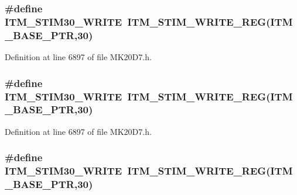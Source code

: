 \subsubsection[{\texorpdfstring{I\+T\+M\+\_\+\+S\+T\+I\+M30\+\_\+\+W\+R\+I\+TE}{ITM_STIM30_WRITE}}]{\setlength{\rightskip}{0pt plus 5cm}\#define I\+T\+M\+\_\+\+S\+T\+I\+M30\+\_\+\+W\+R\+I\+TE~{\bf I\+T\+M\+\_\+\+S\+T\+I\+M\+\_\+\+W\+R\+I\+T\+E\+\_\+\+R\+EG}({\bf I\+T\+M\+\_\+\+B\+A\+S\+E\+\_\+\+P\+TR},30)}\hypertarget{group___i_t_m___register___accessor___macros_ga04082ae600d9a3012f4c9861fe7d0ea3}{}\label{group___i_t_m___register___accessor___macros_ga04082ae600d9a3012f4c9861fe7d0ea3}


Definition at line 6897 of file M\+K20\+D7.\+h.

\subsubsection[{\texorpdfstring{I\+T\+M\+\_\+\+S\+T\+I\+M30\+\_\+\+W\+R\+I\+TE}{ITM_STIM30_WRITE}}]{\setlength{\rightskip}{0pt plus 5cm}\#define I\+T\+M\+\_\+\+S\+T\+I\+M30\+\_\+\+W\+R\+I\+TE~{\bf I\+T\+M\+\_\+\+S\+T\+I\+M\+\_\+\+W\+R\+I\+T\+E\+\_\+\+R\+EG}({\bf I\+T\+M\+\_\+\+B\+A\+S\+E\+\_\+\+P\+TR},30)}\hypertarget{group___i_t_m___register___accessor___macros_ga04082ae600d9a3012f4c9861fe7d0ea3}{}\label{group___i_t_m___register___accessor___macros_ga04082ae600d9a3012f4c9861fe7d0ea3}


Definition at line 6897 of file M\+K20\+D7.\+h.

\subsubsection[{\texorpdfstring{I\+T\+M\+\_\+\+S\+T\+I\+M30\+\_\+\+W\+R\+I\+TE}{ITM_STIM30_WRITE}}]{\setlength{\rightskip}{0pt plus 5cm}\#define I\+T\+M\+\_\+\+S\+T\+I\+M30\+\_\+\+W\+R\+I\+TE~{\bf I\+T\+M\+\_\+\+S\+T\+I\+M\+\_\+\+W\+R\+I\+T\+E\+\_\+\+R\+EG}({\bf I\+T\+M\+\_\+\+B\+A\+S\+E\+\_\+\+P\+TR},30)}\hypertarget{group___i_t_m___register___accessor___macros_ga04082ae600d9a3012f4c9861fe7d0ea3}{}\label{group___i_t_m___register___accessor___macros_ga04082ae600d9a3012f4c9861fe7d0ea3}


